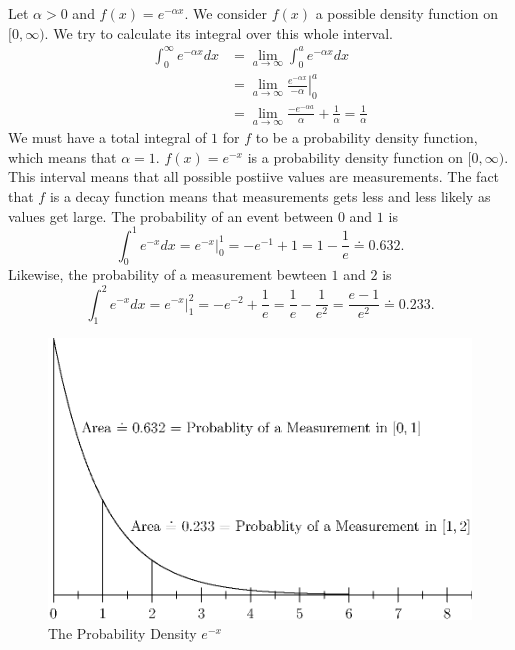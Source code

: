 \documentclass[fleqn]{report}
\begin{document}
\begin{example}
Let $\alpha > 0$ and $f(x) = e^{-\alpha x}$. We consider
$f(x)$ a possible density function on $[0, \infty)$. We try to
calculate its integral over this whole interval.
\begin{align*}
\int_0^\infty e^{-\alpha x} dx & = \lim_{a \rightarrow \infty}
\int_0^a e^{-\alpha x} dx \\
& = \lim_{a \rightarrow \infty} \left. \frac{e^{-\alpha
x}}{-\alpha} \right|_0^a \\
& = \lim_{a \rightarrow \infty} \frac{-e^{-\alpha a}}{\alpha} +
\frac{1}{\alpha} = \frac{1}{\alpha} 
\end{align*}
We must have a total integral of $1$ for $f$ to be a
probability density function, which means that $\alpha = 1$.
$f(x) = e^{-x}$ is a probability density function on
$[0,\infty)$. This interval means that all possible postiive
values are measurements. The fact that $f$ is a decay
function means that measurements gets less and less likely as
values get large. The probability of an event between $0$ and
$1$ is 
\begin{equation*}
\int_0^1 e^{-x} dx = \left. e^{-x} \right|_0^1 = -e^{-1} + 1 = 1 -
\frac{1}{e} \doteq 0.632.
\end{equation*}
Likewise, the probability of a measurement bewteen $1$ and
$2$ is 
\begin{equation*}
\int_1^2 e^{-x} dx = \left. e^{-x}\right|_1^2 = -e^{-2} +
\frac{1}{e} = \frac{1}{e} - \frac{1}{e^2} = \frac{e-1}{e^2}
\doteq 0.233.
\end{equation*}
\end{example}

\begin{figure}[ht]
\centering
\includegraphics[width=12cm]{figure27.eps}
\caption{The Probability Density $e^{-x}$}
\label{figure-probability-density}
\end{figure}
\end{document}
